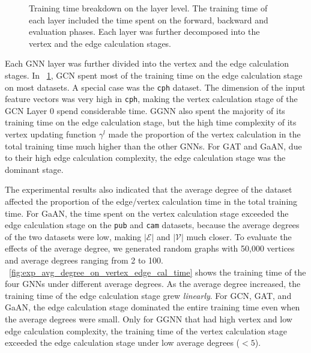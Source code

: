\begin{figure}[H]
    \caption{Training time breakdown on the layer level. The training time of each layer included the time spent on the forward, backward and evaluation phases. Each layer was further decomposed into the vertex and the edge calculation stages.}
    \label{fig:exp_vertex_edge_cal_proportion}
\end{figure}

Each GNN layer was further divided into the vertex and the edge calculation stages.
%
In \figurename~\ref{fig:exp_vertex_edge_cal_proportion}, GCN spent most of the training time on the edge calculation stage on most datasets.
%
A special case was the \texttt{cph} dataset.
%
The dimension of the input feature vectors was very high in \texttt{cph}, making the vertex calculation stage of the GCN Layer 0 spend considerable time.
%
GGNN also spent the majority of its training time on the edge calculation stage, but the high time complexity of its vertex updating function $\gamma^l$ made the proportion of the vertex calculation in the total training time much higher than the other GNNs.
%
For GAT and GaAN, due to their high edge calculation complexity, the edge calculation stage was the dominant stage.

The experimental results also indicated that the average degree of the dataset affected the proportion of the edge/vertex calculation time in the total training time.
%
For GaAN, the time spent on the vertex calculation stage exceeded the edge calculation stage on the \texttt{pub} and \texttt{cam} datasets, because the average degrees of the two datasets were low, making $|\mathcal{E}|$ and $|\mathcal{V}|$ much closer.
%
To evaluate the effects of the average degree, we generated random graphs with 50,000 vertices and average degrees ranging from 2 to 100.
%
\figurename~\ref{fig:exp_avg_degree_on_vertex_edge_cal_time} shows the training time of the four GNNs under different average degrees.
%
As the average degree increased, the training time of the edge calculation stage grew \emph{linearly}.
%
For GCN, GAT, and GaAN, the edge calculation stage dominated the entire training time even when the average degrees were small.
%
Only for GGNN that had high vertex and low edge calculation complexity, the training time of the vertex calculation stage exceeded the edge calculation stage under low average degrees ($<5$).

